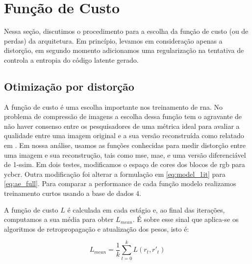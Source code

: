 \section {Função de Custo}
Nessa seção, discutimos o procedimento para a escolha da função de custo (ou de perdas) da arquitetura. Em princípio, levamos em consideração apenas a distorção, em segundo momento adicionamos uma regularização na tentativa de controla a entropia do código latente gerado.

\subsection{Otimização por distorção}


A função de custo é uma escolha importante nos treinamento de \acrshort{rna}. No problema de compressão de imagens a escolha dessa função tem o agravante de não haver consenso entre os pesquisadores de uma métrica ideal para avaliar a qualidade entre uma imagem original e a sua versão reconstruída como relatado em \cite{Priming2017Johnston,End2016Balle}.   
Em nossa análise, usamos as funções conhecidas para medir distorção entre uma imagem e sua reconstrução, tais como \acrshort{mse}, \acrshort{mae}, e uma versão diferenciável de 1-\acrshort{ssim}. Em dois testes, modificamos o espaço de cores dos blocos de \acrshort{rgb} para \acrshort{ycbcr}. Outra modificação foi alterar a formulação em \ref{eq:model_1it} para \ref{eq:ae_full}.  
Para comparar a performance de cada função modelo realizamos treinamento curtos usando a base de dados 4. 

A função de custo $L$ é calculada em cada estágio e, ao final das iterações, computamos a sua média para obter $L_{mean}$. É sobre esse sinal que aplica-se os algoritmos de retropropagação e atualização dos pesos, isto é:

\begin{equation}
L_{mean} = \frac{1}{k} \sum_{t=0}^k L(r_t,r'_t) 
\end{equation}






